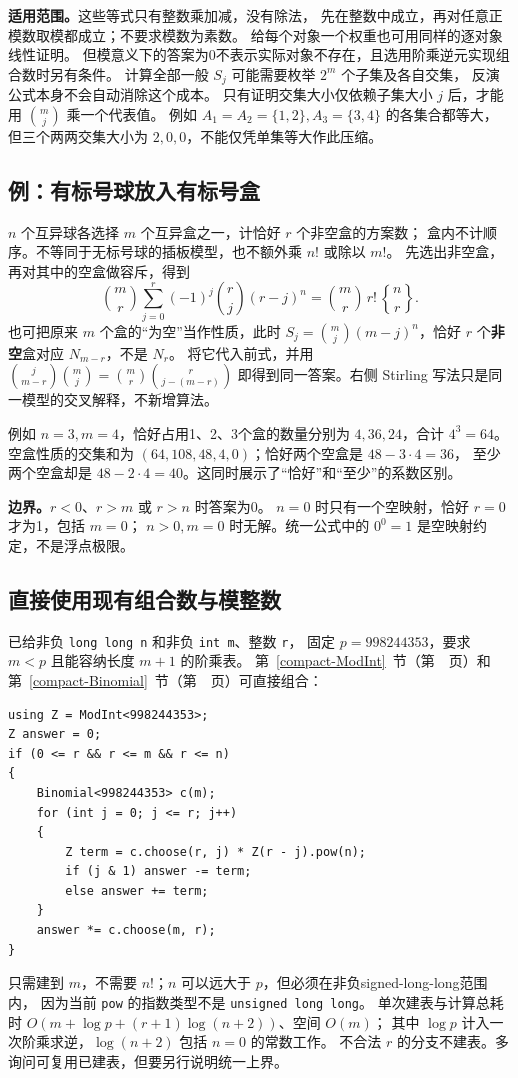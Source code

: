 \textbf{适用范围。}这些等式只有整数乘加减，没有除法，
先在整数中成立，再对任意正模数取模都成立；不要求模数为素数。
给每个对象一个权重也可用同样的逐对象线性证明。
但模意义下的答案为0不表示实际对象不存在，且选用阶乘逆元实现组合数时另有条件。
计算全部一般 $S_j$ 可能需要枚举 $2^m$ 个子集及各自交集，
反演公式本身不会自动消除这个成本。
只有证明交集大小仅依赖子集大小 $j$ 后，才能用 $\binom mj$ 乘一个代表值。
例如 $A_1=A_2=\{1,2\},A_3=\{3,4\}$ 的各集合都等大，
但三个两两交集大小为 $2,0,0$，不能仅凭单集等大作此压缩。

\subsection{例：有标号球放入有标号盒}
$n$ 个互异球各选择 $m$ 个互异盒之一，计恰好 $r$ 个非空盒的方案数；
盒内不计顺序。不等同于无标号球的插板模型，也不额外乘 $n!$ 或除以 $m!$。
先选出非空盒，再对其中的空盒做容斥，得到
\[
\boxed{\binom mr\sum_{j=0}^r(-1)^j\binom rj(r-j)^n
=\binom mr\,r!\,\genfrac{\{}{\}}{0pt}{}{n}{r}.}
\]
也可把原来 $m$ 个盒的“为空”当作性质，此时
$S_j=\binom mj(m-j)^n$，恰好 $r$ 个\textbf{非空}盒对应 $N_{m-r}$，不是 $N_r$。
将它代入前式，并用
$\binom j{m-r}\binom mj=\binom mr\binom r{j-(m-r)}$
即得到同一答案。右侧 Stirling 写法只是同一模型的交叉解释，不新增算法。

例如 $n=3,m=4$，恰好占用1、2、3个盒的数量分别为 $4,36,24$，合计 $4^3=64$。
空盒性质的交集和为 $(64,108,48,4,0)$；恰好两个空盒是 $48-3\cdot4=36$，
至少两个空盒却是 $48-2\cdot4=40$。这同时展示了“恰好”和“至少”的系数区别。

\textbf{边界。}$r<0$、$r>m$ 或 $r>n$ 时答案为0。
$n=0$ 时只有一个空映射，恰好 $r=0$ 才为1，包括 $m=0$；
$n>0,m=0$ 时无解。统一公式中的 $0^0=1$ 是空映射约定，不是浮点极限。

\subsection{直接使用现有组合数与模整数}
已给非负 \texttt{long long n} 和非负 \texttt{int m}、整数 \texttt{r}，
固定 $p=998244353$，要求 $m<p$ 且能容纳长度 $m+1$ 的阶乘表。
第~\ref{compact-ModInt}~节（第~\pageref{compact-ModInt}~页）和
第~\ref{compact-Binomial}~节（第~\pageref{compact-Binomial}~页）可直接组合：
\begin{lstlisting}
using Z = ModInt<998244353>;
Z answer = 0;
if (0 <= r && r <= m && r <= n)
{
    Binomial<998244353> c(m);
    for (int j = 0; j <= r; j++)
    {
        Z term = c.choose(r, j) * Z(r - j).pow(n);
        if (j & 1) answer -= term;
        else answer += term;
    }
    answer *= c.choose(m, r);
}
\end{lstlisting}
只需建到 $m$，不需要 $n!$；$n$ 可以远大于 $p$，但必须在非负signed-long-long范围内，
因为当前 \texttt{pow} 的指数类型不是 \texttt{unsigned long long}。
单次建表与计算总耗时 $O(m+\log p+(r+1)\log(n+2))$、空间 $O(m)$；
其中 $\log p$ 计入一次阶乘求逆，$\log(n+2)$ 包括 $n=0$ 的常数工作。
不合法 $r$ 的分支不建表。多询问可复用已建表，但要另行说明统一上界。

